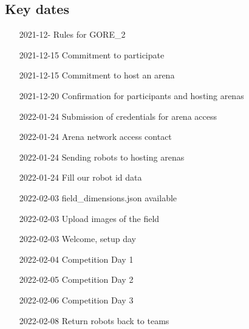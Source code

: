 \subsection{Key dates}

\begin{itemize}[leftmargin=*,labelsep=0.7cm, labelindent=2cm]
    \item [2021-12-\phantom{15}] Rules for GORE\_2
    \item [2021-12-15] Commitment to participate
    \item [2021-12-15] Commitment to host an arena
    \item [2021-12-20] Confirmation for participants and hosting arenas
    \item [2022-01-24] Submission of credentials for arena access
    \item [2022-01-24] Arena network access contact
    \item [2022-01-24] Sending robots to hosting arenas
    \item [2022-01-24] Fill our robot id data
    \item [2022-02-03] field\_dimensions.json available
    \item [2022-02-03] Upload images of the field
    \item [2022-02-03] Welcome, setup day
    \item [2022-02-04] Competition Day 1
    \item [2022-02-05] Competition Day 2
    \item [2022-02-06] Competition Day 3
    \item [2022-02-08] Return robots back to teams
\end{itemize}
